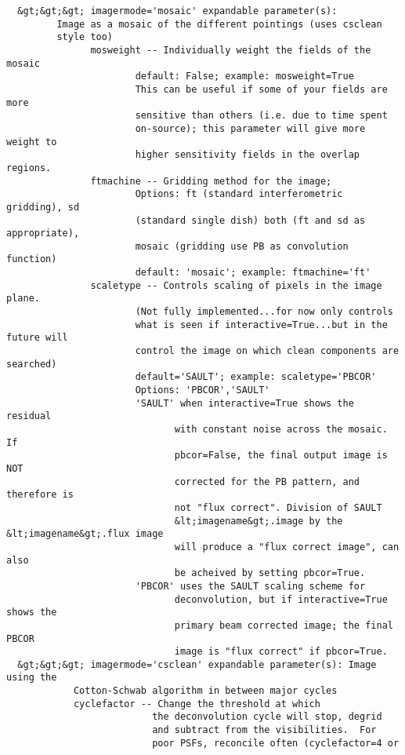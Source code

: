 \begin{verbatim}
  &gt;&gt;&gt; imagermode='mosaic' expandable parameter(s):
         Image as a mosaic of the different pointings (uses csclean 
         style too)
               mosweight -- Individually weight the fields of the mosaic
                       default: False; example: mosweight=True
                       This can be useful if some of your fields are more
                       sensitive than others (i.e. due to time spent 
                       on-source); this parameter will give more weight to 
                       higher sensitivity fields in the overlap regions.
               ftmachine -- Gridding method for the image;
                       Options: ft (standard interferometric gridding), sd
                       (standard single dish) both (ft and sd as appropriate),
                       mosaic (gridding use PB as convolution function)
                       default: 'mosaic'; example: ftmachine='ft'
               scaletype -- Controls scaling of pixels in the image plane.
                       (Not fully implemented...for now only controls 
                       what is seen if interactive=True...but in the future will 
                       control the image on which clean components are searched)
                       default='SAULT'; example: scaletype='PBCOR'
                       Options: 'PBCOR','SAULT'
                       'SAULT' when interactive=True shows the residual
                              with constant noise across the mosaic. If
                              pbcor=False, the final output image is NOT
                              corrected for the PB pattern, and therefore is
                              not "flux correct". Division of SAULT
                              &lt;imagename&gt;.image by the &lt;imagename&gt;.flux image
                              will produce a "flux correct image", can also
                              be acheived by setting pbcor=True.
                       'PBCOR' uses the SAULT scaling scheme for
                              deconvolution, but if interactive=True shows the
                              primary beam corrected image; the final PBCOR
                              image is "flux correct" if pbcor=True.
  &gt;&gt;&gt; imagermode='csclean' expandable parameter(s): Image using the
            Cotton-Schwab algorithm in between major cycles
            cyclefactor -- Change the threshold at which
                          the deconvolution cycle will stop, degrid
                          and subtract from the visibilities.  For
                          poor PSFs, reconcile often (cyclefactor=4 or

\end{verbatim}

